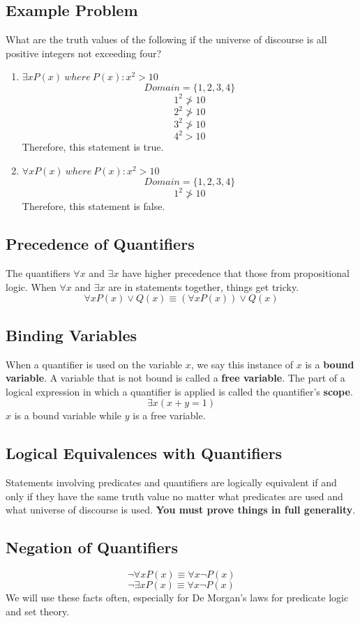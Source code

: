 \documentclass{math}
\begin{document}
\subsection*{Example Problem}
What are the truth values of the following if the universe of discourse is all
positive integers not exceeding four?
\begin{enumerate}
  \item \( \exists{x}P(x)\ where\ P(x):x^{2} > 10 \)
  \[ Domain = \{1, 2, 3, 4\} \]
  \[ 1^{2} \ngtr 10 \]
  \[ 2^{2} \ngtr 10 \]
  \[ 3^{2} \ngtr 10 \]
  \[ 4^{2} > 10 \]
  Therefore, this statement is true.
  \item \( \forall{x}P(x)\ where\ P(x):x^{2} > 10 \)
  \[ Domain = \{1, 2, 3, 4\} \]
  \[ 1^{2} \ngtr 10 \]
  Therefore, this statement is false.
\end{enumerate}

\subsection*{Precedence of Quantifiers}
The quantifiers \( \forall{x} \) and \( \exists{x} \) have higher precedence
that those from propositional logic. When \( \forall{x} \) and \( \exists{x} \)
are in statements together, things get tricky.
\[ \forall{x}P(x) \vee Q(x) \equiv (\forall{x}P(x)) \vee Q(x) \]

\subsection*{Binding Variables}
When a quantifier is used on the variable \( x \), we say this instance of
\( x \) is a \textbf{bound variable}. A variable that is not bound is called a
\textbf{free variable}. The part of a logical expression in which a quantifier
is applied is called the quantifier's \textbf{scope}.
\[ \exists{x}(x+y = 1) \]
\( x \) is a bound variable while \( y \) is a free variable.

\subsection*{Logical Equivalences with Quantifiers}
Statements involving predicates and quantifiers are logically equivalent if and
only if they have the same truth value no matter what predicates are used and
what universe of discourse is used. \textbf{You must prove things in full
generality}.

\subsection*{Negation of Quantifiers}
\[ \neg{\forall{x}P(x)} \equiv \forall x \neg{P(x)} \]
\[ \neg{\exists{x}P(x)} \equiv \forall x \neg{P(x)} \]
We will use these facts often, especially for De Morgan's laws for predicate
logic and set theory.
\end{document}

